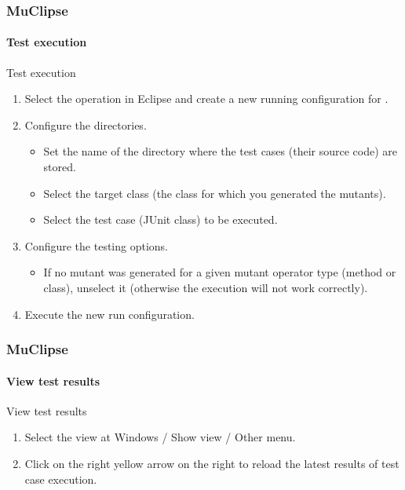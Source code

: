 \begin{frame}
\frametitle{MuClipse}
\framesubtitle{Test execution}

\begin{block:procedure}{Test execution}
\begin{enumerate}
	\item Select the  operation in Eclipse and create a new
	running configuration for .

	\item Configure the directories.
	\begin{itemize}
		\item Set the name of the directory where the test cases (their
		source code) are stored.

		\item Select the target class (the class for which you generated the
		mutants).

		\item Select the test case (JUnit class) to be executed.
	\end{itemize}

	\item Configure the testing options.
	\begin{itemize}
		\item If no mutant was generated for a given mutant operator type
		(method or class), unselect it (otherwise the execution will not work
		correctly).
	\end{itemize}

	\item Execute the new run configuration.
\end{enumerate}
\end{block:procedure}
\end{frame}



\begin{frame}
\frametitle{MuClipse}
\framesubtitle{View test results}

\begin{block:procedure}{View test results}
\begin{enumerate}
	\item Select the  view at Windows / Show view /
	Other menu.

	\item Click on the right yellow arrow on the right to reload the latest
	results of test case execution.
\end{enumerate}
\end{block:procedure}
\end{frame}
